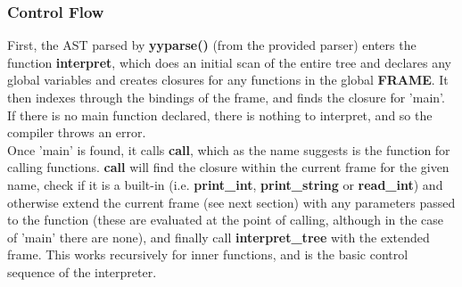 \documentclass[12pt]{article}
\begin{document}
\subsubsection{Control Flow}\label{flow}
First, the AST parsed by \textbf{yyparse()} (from the provided parser) enters the function \textbf{interpret}, which does an initial scan of the entire tree and declares any global variables and creates closures for any functions in the global \textbf{FRAME}. It then indexes through the bindings of the frame, and finds the closure for 'main'. If there is no main function declared, there is nothing to interpret, and so 
the compiler throws an error. \\\newline Once 'main' is found, it calls \textbf{call}, which as the name suggests is the function for calling functions.
 \textbf{call} will find the closure within the current frame for the given name, check if it is a built-in (i.e. \textbf{print\_int}, \textbf{print\_string} or \textbf{read\_int}) and otherwise extend the current frame (see next section) with any parameters passed to the function (these are evaluated at the point of calling, although in the case of 'main' there are none), and finally call \textbf{interpret\_tree} with the extended frame.
 This works recursively for inner functions, and is the basic control sequence of the interpreter.
\end{document}
